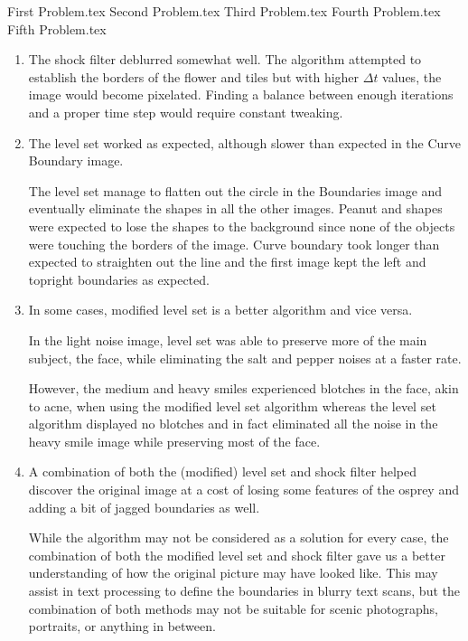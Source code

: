 \documentclass{article}
\begin{document}
\begin{enumerate}
  {First Problem.tex}
  {Second Problem.tex}
  {Third Problem.tex}
  {Fourth Problem.tex}
  {Fifth Problem.tex}
\end{enumerate}

\begin{enumerate}
  \item The shock filter deblurred somewhat well. The algorithm attempted to
  establish the borders of the flower and tiles but with higher $\Delta t$
  values, the image would become pixelated. Finding a balance between enough
  iterations and a proper time step would require constant tweaking.

  \item The level set worked as expected, although slower than expected in the Curve Boundary image.

  The level set manage to flatten out the circle in the Boundaries image and eventually eliminate the shapes in all the other images. Peanut and shapes were expected to lose the shapes to the background since none of the objects were touching the borders of the image. Curve boundary took longer than expected to straighten out the line and the first image kept the left and topright boundaries as expected.

  \item In some cases, modified level set is a better algorithm and vice versa.

  In the light noise image, level set was able to preserve more of the main subject, the face, while eliminating the salt and pepper noises at a faster rate.

  However, the medium and heavy smiles experienced blotches in the face, akin to acne, when using the modified level set algorithm whereas the level set algorithm displayed no blotches and in fact eliminated all the noise in the heavy smile image while preserving most of the face.

  \item A combination of both the (modified) level set and shock filter helped discover the original image at a cost of losing some features of the osprey and adding a bit of jagged boundaries as well.

  While the algorithm may not be considered as a solution for every case, the combination of both the modified level set and shock filter gave us a better understanding of how the original picture may have looked like. This may assist in text processing to define the boundaries in blurry text scans, but the combination of both methods may not be suitable for scenic photographs, portraits, or anything in between.


\end{enumerate}
\end{document}
